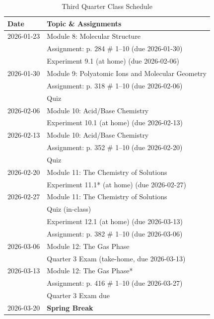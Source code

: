 \documentclass[11pt, oneside]{article}   	%
\begin{document}
\begin{table}[h]
\centering
\begin{tabular}{ l | l }
Date & Topic \& Assignments \\
\hline
2026-01-23 & Module 8:  Molecular Structure \\
		  & Assignment: p. 284 \# 1--10 (due 2026-01-30) \\
		  & Experiment 9.1 (at home) (due 2026-02-06) \\

\hline
2026-01-30 & Module 9: Polyatomic Ions and Molecular Geometry \\
                   & Assignment: p. 318 \# 1--10 (due 2026-02-06) \\
                   & Quiz \\
                   
\hline
2026-02-06 & Module 10: Acid/Base Chemistry \\
                   & Experiment 10.1 (at home) (due 2026-02-13) \\

\hline
2026-02-13 & Module 10: Acid/Base Chemistry \\
                   & Assignment: p. 352 \# 1--10 (due 2026-02-20) \\
                   & Quiz \\

\hline
2026-02-20 & Module 11: The Chemistry of Solutions \\
                   & Experiment 11.1* (at home) (due 2026-02-27)\\

\hline
2026-02-27 & Module 11: The Chemistry of Solutions \\
                   & Quiz (in-class) \\
                   & Experiment 12.1 (at home) (due 2026-03-13)\\
                   & Assignment: p. 382 \# 1--10 (due 2026-03-06) \\ 

\hline
2026-03-06 & Module 12: The Gas Phase \\
                   & Quarter 3 Exam (take-home, due 2026-03-13) \\
                   
\hline
2026-03-13 & Module 12: The Gas Phase* \\
                   & Assignment: p. 416 \# 1--10 (due 2026-03-27)\\
                   & Quarter 3 Exam due \\

\hline
2026-03-20 & \textbf{Spring Break} \\

\end{tabular}
\caption{Third Quarter Class Schedule}\label{table:class-schedule-q3}
\end{table}
\end{document}
